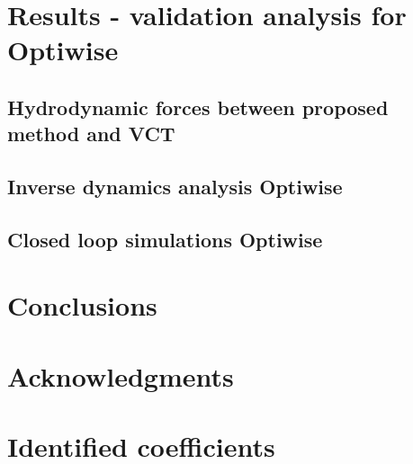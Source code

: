 \documentclass[preprint,11pt,authoryear]{elsarticle}
\begin{document}
\section{Results - validation analysis for Optiwise}
\label{sec:results_optiwise}

\FloatBarrier
\subsection{Hydrodynamic forces between proposed method and VCT}


\subsection{Inverse dynamics analysis Optiwise}

\FloatBarrier

\subsection{Closed loop simulations Optiwise}

\FloatBarrier

%



\section{Conclusions}
\label{sec:conclusions}

\FloatBarrier

\section*{Acknowledgments}



%


\appendix
\section{Identified coefficients}
\setcounter{table}{0}
\label{sec:coefficients}

\FloatBarrier
\end{document}
